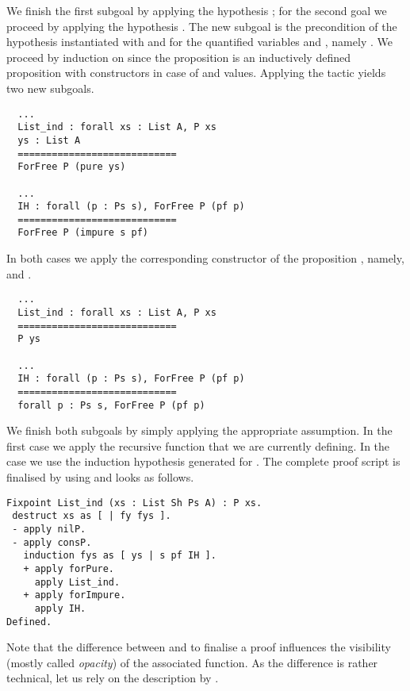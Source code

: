 We finish the first subgoal by applying the hypothesis ; for the second goal we proceed by applying the hypothesis .
The new subgoal is the precondition of the hypothesis  instantiated with  and  for the quantified variables  and , namely .
We proceed by induction on  since the proposition  is an inductively defined proposition with constructors in case of  and  values.
Applying the tactic  yields two new subgoals.

\begin{verbatim}
  ...
  List_ind : forall xs : List A, P xs
  ys : List A
  ============================
  ForFree P (pure ys)

  ...
  IH : forall (p : Ps s), ForFree P (pf p)
  ============================
  ForFree P (impure s pf)
\end{verbatim}

In both cases we apply the corresponding constructor of the proposition , namely,  and .

\begin{verbatim}
  ...
  List_ind : forall xs : List A, P xs
  ============================
  P ys

  ...
  IH : forall (p : Ps s), ForFree P (pf p)
  ============================
  forall p : Ps s, ForFree P (pf p)
\end{verbatim}

We finish both subgoals by simply applying the appropriate assumption.
In the first case we apply the recursive function  that we are currently defining.
In the  case we use the induction hypothesis generated for .
The complete proof script is finalised by using  and looks as follows.

\begin{verbatim}
Fixpoint List_ind (xs : List Sh Ps A) : P xs.
 destruct xs as [ | fy fys ].
 - apply nilP.
 - apply consP.
   induction fys as [ ys | s pf IH ].
   + apply forPure.
     apply List_ind.
   + apply forImpure.
     apply IH.
Defined.
\end{verbatim}

Note that the difference between  and  to finalise a proof influences the visibility (mostly called \emph{opacity}) of the associated function.
As the difference is rather technical, let us rely on the description by \citet{chlipala2011certified}.


